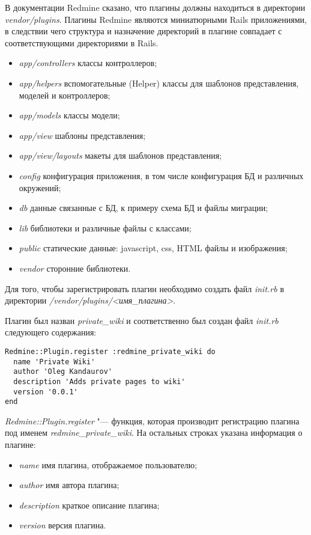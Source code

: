 В документации Redmine сказано, что плагины должны находиться в директории
\textit{vendor/plugins}. Плагины Redmine являются миниатюрными Rails
приложениями, в следствии чего структура и назначение директорий в плагине
совпадает с соответствующими директориями в Rails.
\begin{itemize}
\item \textit{app/controllers} классы контроллеров;
\item \textit{app/helpers} вспомогательные (Helper) классы для шаблонов
представления, моделей и контроллеров;
\item \textit{app/models} классы модели;
\item \textit{app/view} шаблоны представления;
\item \textit{app/view/layouts} макеты для шаблонов представления;
\item \textit{config} конфигурация приложения, в том числе конфигурация БД и
различных окружений;
\item \textit{db} данные связанные с БД, к примеру схема БД и файлы миграции;
\item \textit{lib} библиотеки и различные файлы с классами;
\item \textit{public} статические данные: javascript, css, HTML файлы и
изображения;
\item \textit{vendor} сторонние библиотеки.
\end{itemize}
Для того, чтобы зарегистрировать плагин необходимо создать файл
\textit{init.rb} в директории \textit{/vendor/plugins/<имя\_плагина>}.

Плагин был назван \textit{private\_wiki} и соответственно был создан файл
\textit{init.rb} следующего содержания:
\small{\begin{lstlisting}
Redmine::Plugin.register :redmine_private_wiki do
  name 'Private Wiki'
  author 'Oleg Kandaurov'
  description 'Adds private pages to wiki'
  version '0.0.1'
end
\end{lstlisting}}
\textit{Redmine::Plugin.register} "--- функция, которая производит регистрацию
плагина под именем \textit{redmine\_private\_wiki}. На остальных строках
указана информация о плагине:
\begin{itemize} 
  \item \textit{name} имя плагина, отображаемое пользователю;
  \item \textit{author} имя автора плагина;
  \item \textit{description} краткое описание плагина;
  \item \textit{version} версия плагина.
\end{itemize}

